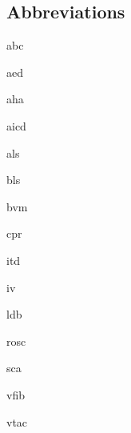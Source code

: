 \documentclass[../../EMT-169.tex]{subfiles}
\begin{document}
\subsection*{Abbreviations}
\begin{description}[leftmargin=!,labelwidth=\widthof{\bfseries ABCDE}]
	\item [\acrshort{abc}] 			\acrlong{abc}
	\item [\acrshort{aed}] 			\acrlong{aed}
	\item [\acrshort{aha}] 			\acrlong{aha}
	\item [\acrshort{aicd}] 		\acrlong{aicd}
	\item [\acrshort{als}] 			\acrlong{als}
	\item [\acrshort{bls}] 			\acrlong{bls}
	\item [\acrshort{bvm}] 			\acrlong{bvm}
	\item [\acrshort{cpr}] 			\acrlong{cpr}
	\item [\acrshort{itd}] 			\acrlong{itd}
	\item [\acrshort{iv}] 			\acrlong{iv}		%
	\item [\acrshort{ldb}] 			\acrlong{ldb}
	\item [\acrshort{rosc}] 		\acrlong{rosc}
	\item [\acrshort{sca}] 			\acrlong{sca}
	\item [\acrshort{vfib}] 		\acrlong{vfib}
	\item [\acrshort{vtac}] 		\acrlong{vtac}
\end{description}
\end{document}
